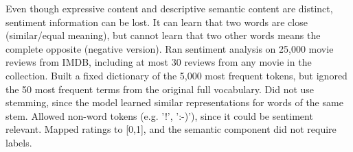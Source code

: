 Even though expressive content and descriptive semantic content are distinct, sentiment information can be lost. 
It can learn that two words are close (similar/equal meaning), but cannot learn that two other words means the complete opposite (negative version).
Ran sentiment analysis on 25,000 movie reviews from IMDB, including at most 30 reviews from any movie in the collection. 
Built a fixed dictionary of the 5,000 most frequent tokens, but ignored the 50 most frequent terms from the original full vocabulary. 
Did not use stemming, since the model learned similar representations for words of the same stem.
Allowed non-word tokens (e.g. '!', ':-)'), since it could be sentiment relevant. 
Mapped ratings to [0,1], and the semantic component did not require labels.
\cite{Maas2011}	


